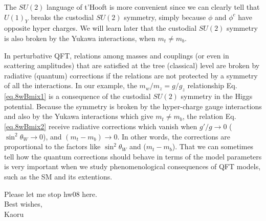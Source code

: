 \documentclass[12pt]{article}
\begin{document}
  The $SU(2)$ language of t'Hooft is more convenient since we can clearly
  tell that $U(1)_Y$ breaks the custodial $SU(2)$ symmetry, simply because
  $\phi$ and $\phi^c$ have opposite hyper charges.  We will learn later
  that the custodial $SU(2)$ symmetry is also broken by the Yukawa
  interactions, when $m_t \neq m_b$.

  In perturbative QFT, relations among masses and couplings (or
  even in scattering amplitudes) that are satisfied at the tree
  (classical) level are broken by radiative (quantum) corrections
  if the relations are not protected by a symmetry of all the
  interactions.  In our example, the $m_w/m_z = g/g_z$ relationship
  Eq.\ref{eq.8wBmix1} is a consequence of the custodial $SU(2)$ symmetry in the Higgs potential. Because the symmetry is broken by the hyper-charge
  gauge interactions and also by the Yukawa interactions which give
  $m_t \neq m_b$, the relation Eq.\ref{eq.8wBmix2} receive radiative corrections which vanish when $g'/g \to 0$ ($\sin^2\theta_W \to 0$), and $(m_t-m_b) \to 0$.
  In other words, the corrections are proportional to the factors
  like $\sin^2\theta_W$ and ($m_t-m_b$). That we can sometimes tell how
  the quantum corrections should behave in terms of the model
  parameters is very important when we study phenomenological
  consequences of QFT models, such as the SM and its extentions.

Please let me stop hw08 here.\\

Best wishes,\\

Kaoru
\end{document}
